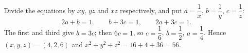 Divide the equations by $xy$, $yz$ and $xz$ respectively, and put $a=\dfrac1x$, $b=\dfrac1y$, $c=\dfrac1z$:
\[2a+b=1,\qquad b+3c=1,\qquad 2a+3c=1.\]
The first and third give $b=3c$; then $6c=1$, so $c=\dfrac16$, $b=\dfrac12$, $a=\dfrac14$. Hence $(x,y,z)=(4,2,6)$ and $x^2+y^2+z^2=16+4+36=\boxed{56}$.
